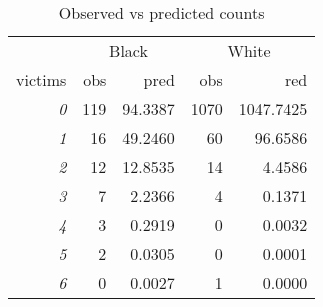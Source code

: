 \begin{table}[!h]

\caption{\label{tab:obs_vs_pred}Observed vs predicted counts}
\centering
\fontsize{9}{11}\selectfont
\begin{tabular}[t]{>{}rrrrr}
\toprule
\multicolumn{1}{c}{ } & \multicolumn{2}{c}{Black} & \multicolumn{2}{c}{White} \\
\cmidrule(l{3pt}r{3pt}){2-3} \cmidrule(l{3pt}r{3pt}){4-5}
victims & obs & pred & obs & red\\
\midrule
\em{0} & 119 & 94.3387 & 1070 & 1047.7425\\
\em{1} & 16 & 49.2460 & 60 & 96.6586\\
\em{2} & 12 & 12.8535 & 14 & 4.4586\\
\em{3} & 7 & 2.2366 & 4 & 0.1371\\
\em{4} & 3 & 0.2919 & 0 & 0.0032\\
\addlinespace
\em{5} & 2 & 0.0305 & 0 & 0.0001\\
\em{6} & 0 & 0.0027 & 1 & 0.0000\\
\bottomrule
\end{tabular}
\end{table}
